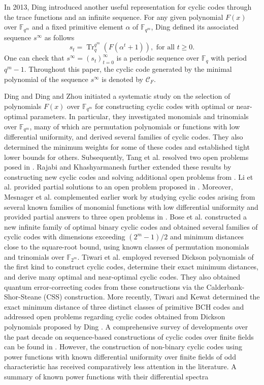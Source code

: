 \documentclass[pdflatex,sn-mathphys-num]{sn-jnl}%
\theoremstyle{thmstyleone}%
\theoremstyle{thmstyletwo}%
\theoremstyle{thmstylethree}%
\begin{document}
\par In 2013, Ding \cite{P3} introduced another useful representation for cyclic codes through the trace functions and an infinite sequence. For any given polynomial $F(x)$ over $\mathbb{F}_{q^m}$ and a fixed primitive element $\alpha$ of $\mathbb{F}_{q^m}$, Ding \cite{P3} defined its associated sequence $s^{\infty}$ as follows 
\begin{equation}\label{Eq3}
    s_{t}=\operatorname{Tr}_{q}^{q^m}(F(\alpha^t+1)),\text{ for all }t\geq 0.
\end{equation}
One can check that $s^{\infty}=(s_{t})_{t=0}^{\infty}$ is a periodic sequence over $\mathbb{F}_{q}$ with period $q^m-1$. Throughout this paper, the cyclic code generated by the minimal polynomial of the sequence $s^{\infty}$ is denoted by $\mathcal{C}_{F}$. 
\par Ding \cite{P3} and Ding and Zhou \cite{P2} initiated a systematic study on the selection of polynomials $F(x)$ over $\mathbb{F}_{q^m}$ for constructing cyclic codes with optimal or near-optimal parameters. In particular, they investigated monomials and trinomials over $\mathbb{F}_{q^m}$, many of which are permutation polynomials or functions with low differential uniformity, and derived several families of cyclic codes. They also determined the minimum weights for some of these codes and established tight lower bounds for others. Subsequently, Tang et al. \cite{Tang} resolved two open problems posed in \cite{P3,P2}. Rajabi and Khashyarmanesh \cite{Rajabi} further extended these results by constructing new cyclic codes and solving additional open problems from \cite{P3}. Li et al. \cite{Li} provided partial solutions to an open problem proposed in \cite{P2}. Moreover, Mesnager et al. \cite{Mesnager} complemented earlier work by studying cyclic codes arising from several known families of monomial functions with low differential uniformity and provided partial answers to three open problems in \cite{P2,P3}. Bose et al. \cite{Bose} constructed a new infinite family of optimal binary cyclic codes and obtained several families of cyclic codes with dimensions exceeding $(2^m-1)/2$ and minimum distances close to the square-root bound, using known classes of permutation monomials and trinomials over $\mathbb{F}_{2^m}$. Tiwari et al. \cite{Kewat} employed reversed Dickson polynomials of the first kind to construct cyclic codes, determine their exact minimum distances, and derive many optimal and near-optimal cyclic codes. They also obtained quantum error-correcting codes from these constructions via the Calderbank-Shor-Steane (CSS) construction. More recently, Tiwari and Kewat \cite{Kewat1} determined the exact minimum distance of three distinct classes of primitive BCH codes and addressed open problems regarding cyclic codes obtained from Dickson polynomials proposed by Ding \cite{Survey1}.  A comprehensive survey of developments over the past decade on sequence-based constructions of cyclic codes over finite fields can be found in \cite{Survey}. However, the construction of non-binary cyclic codes using power functions with known differential uniformity over finite fields of odd characteristic has received comparatively less attention in the literature. A summary of known power functions with their differential spectra 
\end{document}
